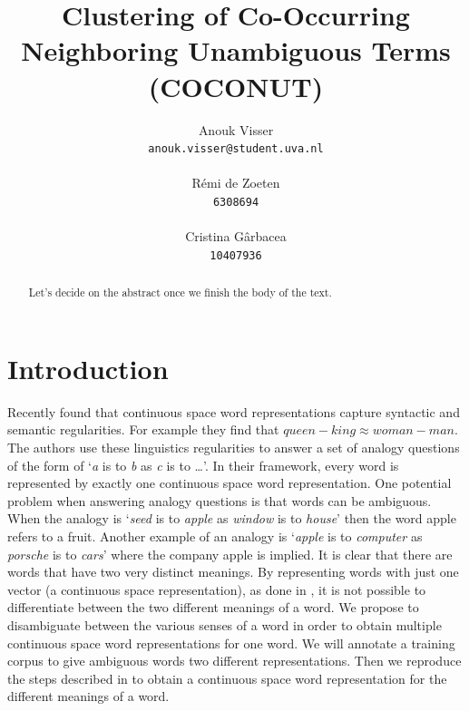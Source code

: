 \documentclass[11pt]{article}
\title{Clustering of Co-Occurring Neighboring Unambiguous Terms (COCONUT)}
\author{
Anouk Visser \\
{\tt anouk.visser@student.uva.nl}\\
  \\\And
  R\'emi de Zoeten \\
  {\tt 6308694}\\
   \\\And
  Cristina G\^arbacea \\
  {\tt 10407936}
  \\}
\date{}
\begin{document}
\maketitle
\begin{abstract}
Let's decide on the abstract once we finish the body of the text.
\end{abstract}

\section{Introduction}
Recently \cite{Mikolov:13} found that continuous space word representations capture syntactic and semantic regularities. For example they find that $\textit{queen} - \textit{king} \approx \textit{woman}  -\textit{man}$. The authors use these linguistics regularities to answer a set of analogy questions of the form of `\textit{a} is to \textit{b} as \textit{c} is to \dots'. In their framework, every word is represented by exactly one continuous space word representation. One potential problem when answering analogy questions is that words can be ambiguous. When the analogy is `\textit{seed} is to \textit{apple} as \textit{window} is to \textit{house}' then the word apple refers to a fruit. Another example of an analogy is `\textit{apple} is to \textit{computer} as \textit{porsche} is to \textit{cars}' where the company apple is implied. It is clear that there are words that have two very distinct meanings. By representing words with just one vector (a continuous space representation), as done in \cite{Mikolov:13}, it is not possible to differentiate between the two different meanings of a word. We propose to disambiguate between the various senses of a word in order to obtain multiple continuous space word representations for one word. We will annotate a training corpus to give ambiguous words two different representations. Then we reproduce the steps described in \cite{Mikolov:13} to obtain a continuous space word representation for the different meanings of a word.
\end{document}
